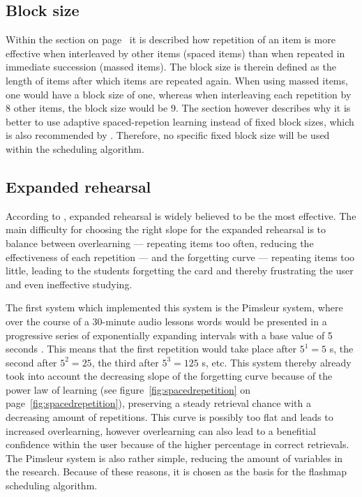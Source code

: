         \subsection{Block size}

Within the  section on page~\pageref{subsec:spacingeffect} it is described how repetition of an item is more effective when interleaved by other items (spaced items) than when repeated in immediate succession (massed items). The block size is therein defined as the length of items after which items are repeated again. When using massed items, one would have a block size of one, whereas when interleaving each repetition by 8 other items, the block size would be 9. The  section however describes why it is better to use adaptive spaced-repetion learning instead of fixed block sizes, which is also recommended by . Therefore, no specific fixed block size will be used within the scheduling algorithm.
        
        \subsection{Expanded rehearsal}

According to , expanded rehearsal is widely believed to be the most effective. The main difficulty for choosing the right slope for the expanded rehearsal is to balance between overlearning --- repeating items too often, reducing the effectiveness of each repetition --- and the forgetting curve --- repeating items too little, leading to the students forgetting the card and thereby frustrating the user and even ineffective studying.

The first system which implemented this system is the Pimsleur system, where over the course of a 30-minute audio lessons words would be presented in a progressive series of exponentially expanding intervals with a base value of 5 seconds \cite{microlearning}. This means that the first repetition would take place after $5^1=5$ s, the second after $5^2=25$, the third after $5^3=125$ s, etc. This system thereby already took into account the decreasing slope of the forgetting curve because of the power law of learning (see figure~\ref{fig:spacedrepetition} on page~\ref{fig:spacedrepetition}), preserving a steady retrieval chance with a decreasing amount of repetitions. This curve is possibly too flat and leads to increased overlearning, however overlearning can also lead to a benefitial confidence within the user because of the higher percentage in correct retrievals. The Pimsleur system is also rather simple, reducing the amount of variables in the research. Because of these reasons, it is chosen as the basis for the flashmap scheduling algorithm.

